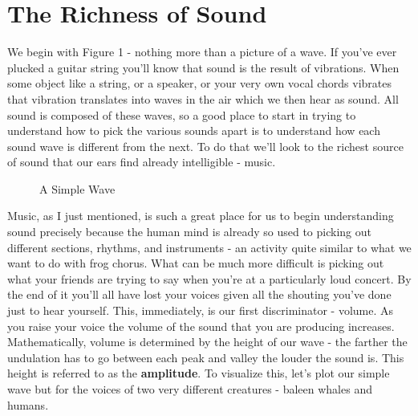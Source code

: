 \documentclass[10pt,a4paper]{article}
\begin{document}
\section{The Richness of Sound}
We begin with Figure 1 - nothing more than a picture of a wave. If you've ever plucked a guitar string you'll know that sound is the result of vibrations. When some object like a string, or a speaker, or your very own vocal chords vibrates that vibration translates into waves in the air which we then hear as sound. All sound is composed of these waves, so a good place to start in trying to understand how to pick the various sounds apart is to understand how each sound wave is different from the next. To do that we'll look to the richest source of sound that our ears find already intelligible - music. 

\begin{figure}[!htb]
\caption{\label{fig:my-label} A Simple Wave}
\end{figure}

Music, as I just mentioned, is such a great place for us to begin understanding sound precisely because the human mind is already so used to picking out different sections, rhythms, and instruments - an activity quite similar to what we want to do with frog chorus. What can be much more difficult is picking out what your friends are trying to say when you're at a particularly loud concert. By the end of it you'll all have lost your voices given all the shouting you've done just to hear yourself. This, immediately, is our first discriminator - volume. As you raise your voice the volume of the sound that you are producing increases. Mathematically, volume is determined by the height of our wave - the farther the undulation has to go between each peak and valley the louder the sound is. This height is referred to as the \textbf{amplitude}. To visualize this, let's plot our simple wave but for the voices of two very different creatures - baleen whales and humans. 
\end{document}
